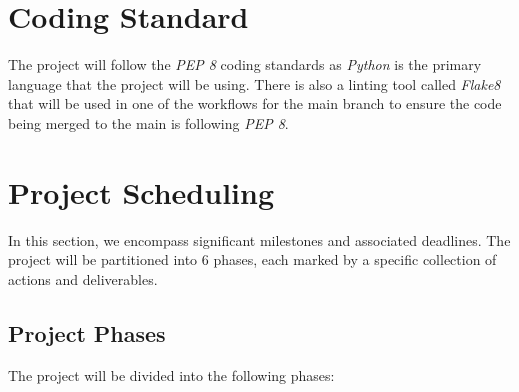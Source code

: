 \documentclass{article}
\begin{document}
\section{Coding Standard}
The project will follow the \textit{PEP 8} coding standards as \textit{Python} is the primary language that the project will be using. There is also a linting tool called \textit{Flake8}  that will be used in one of the workflows for the main branch to ensure the code being merged to the main is following \textit{PEP 8}.

\section{Project Scheduling}

In this section, we encompass significant milestones and associated deadlines. The project will be partitioned into 6 phases, each marked by a specific collection of actions and deliverables.

\subsection{Project Phases}

The project will be divided into the following phases:
\end{document}
